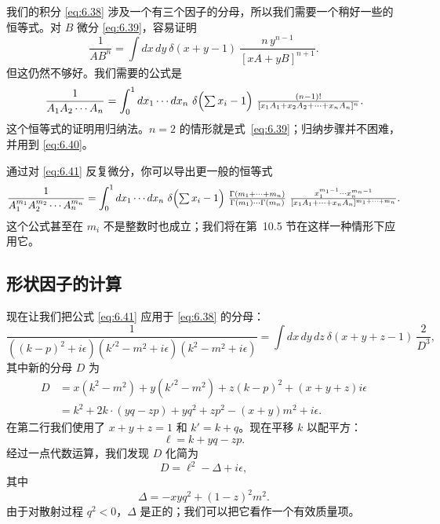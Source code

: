 我们的积分 \eqref{eq:6.38} 涉及一个有三个因子的分母，所以我们需要一个稍好一些的恒等式。对 $B$ 微分 \eqref{eq:6.39}，容易证明
\begin{equation}
  \frac{1}{AB^n} = \int dx\,dy\ \delta(x+y-1)\
    \frac{n\,y^{n-1}}{[xA+yB]^{n+1}} .
  \label{eq:6.40}
\end{equation}
但这仍然不够好。我们需要的公式是
\begin{equation}
  \frac{1}{A_1A_2\cdots A_n}
  = \int_0^1 dx_1\cdots dx_n\ \delta\Bigl( \textstyle\sum x_i - 1 \Bigr)\
    \frac{(n-1)!}{[x_1A_1 + x_2A_2 + \cdots + x_nA_n]^n} .
  \label{eq:6.41}
\end{equation}
这个恒等式的证明用归纳法。$n=2$ 的情形就是式~\eqref{eq:6.39}；归纳步骤并不困难，并用到 \eqref{eq:6.40}。

通过对 \eqref{eq:6.41} 反复微分，你可以导出更一般的恒等式
\begin{equation}
  \frac{1}{A_1^{m_1}A_2^{m_2}\cdots A_n^{m_n}}
  = \int_0^1 dx_1\cdots dx_n\ \delta\Bigl( \textstyle\sum x_i - 1 \Bigr)\
    \frac{\Gamma(m_1+\cdots+m_n)}{\Gamma(m_1)\cdots\Gamma(m_n)}\
    \frac{x_1^{m_1-1}\cdots x_n^{m_n-1}}
      {[x_1A_1+\cdots+x_nA_n]^{m_1+\cdots+m_n}} .
  \label{eq:6.42}
\end{equation}
这个公式甚至在 $m_i$ 不是整数时也成立；我们将在第~10.5 节在这样一种情形下应用它。

\subsection{形状因子的计算}

现在让我们把公式 \eqref{eq:6.41} 应用于 \eqref{eq:6.38} 的分母：
\begin{equation}
  \frac{1}{((k-p)^2+i\epsilon)(k'^2-m^2+i\epsilon)(k^2-m^2+i\epsilon)}
  = \int dx\,dy\,dz\ \delta(x+y+z-1)\ \frac{2}{D^3} ,
\end{equation}
其中新的分母 $D$ 为
\begin{equation}
  \begin{aligned}
    D &= x(k^2-m^2) + y(k'^2-m^2) + z(k-p)^2 + (x+y+z)i\epsilon\\
    &= k^2 + 2k\cdot(yq-zp) + yq^2 + zp^2 - (x+y)m^2 + i\epsilon .
  \end{aligned}
\end{equation}
在第二行我们使用了 $x+y+z=1$ 和 $k' = k+q$。现在平移 $k$ 以配平方：
\begin{equation}
  \ell = k + yq - zp .
\end{equation}
经过一点代数运算，我们发现 $D$ 化简为
\begin{equation}
  D = \ell^2 - \Delta + i\epsilon,
  \label{eq:6.43}
\end{equation}
其中
\begin{equation}
  \Delta = -xyq^2 + (1-z)^2m^2 .
  \label{eq:6.44}
\end{equation}
由于对散射过程 $q^2 < 0$，$\Delta$ 是正的；我们可以把它看作一个有效质量项。

